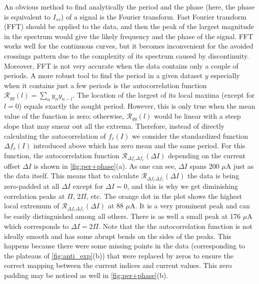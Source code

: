 \documentclass[%
 aip,
 draft,
 amsmath,amssymb,
 reprint,%
]{revtex4-1}
\begin{document}
An obvious method to find analytically the period and the phase (here, the phase is equivalent to $I_{ss}$) of a signal is the Fourier transform. Fast Fourier transform (FFT) should be applied to the data, and then the peak of the largest magnitude in the spectrum would give the likely frequency and the phase of the signal. FFT works well for the continuous curves, but it becomes inconvenient for the avoided crossings pattern due to the complexity of its spectrum caused by discontinuity. Moreover, FFT is not very accurate when the data contains only a couple of periods. A more robust tool to find the period in a given dataset $y$ especially when it contains just a few periods is the autocorrelation function $\mathcal{R}_{y y}(l) = \sum_n y_n y_{n-l}$. The location of the largest of its local maxima (except for $l=0$) equals exactly the sought period\cite{parthasarathy2006}. However, this is only true when the mean value of the function is zero; otherwise, $\mathcal{R}_{y y}(l)$ would be linear with a steep slope that may smear out all the extrema. Therefore, instead of directly calculating the autocorrelation of $f_r (I)$ we consider the standardized function $\Delta f_r (I)$ introduced above which has zero mean and the same period. For this function, the autocorrelation function $\mathcal{R}_{\Delta f_r \Delta f_r}(\Delta I)$ depending on the current offset $\Delta I$ is shown in \autoref{fig:per+phase}(a). As one can see, $\Delta I$ spans 200 $\mu$A just as the data itself. This means that to calculate $\mathcal{R}_{\Delta f_r \Delta f_r}(\Delta I)$ the data is being zero-padded at all $\Delta I$ except for $\Delta I = 0$, and this is why we get diminishing correlation peaks at $\Pi$, $2\Pi$, etc. The orange dot in the plot shows the highest local extremum of $\mathcal{R}_{\Delta f_r \Delta f_r}(\Delta I)$ at 88 $\mu$A. It is a very prominent peak and can be easily distinguished among all others. There is as well a small peak at 176 $\mu$A which corresponds to $\Delta I = 2\Pi$. Note that the the autocorrelation function is not ideally smooth and has some abrupt bends on the sides of the peaks. This happens because there were some missing points in the data (corresponding to the plateaus of \autoref{fig:anti_exp}(b)) that were replaced by zeros to ensure the correct mapping between the current indices and current values. This zero padding may be noticed as well in \autoref{fig:per+phase}(b).
\end{document}
